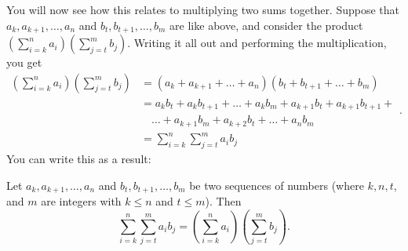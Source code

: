 \documentclass[
  12pt,
  a4paper, oneside]{starmastarticle}
\begin{document}
You will now see how this relates to multiplying two sums together.
Suppose that \(a_k,a_{k+1},\ldots,a_n\) and \(b_t,b_{t+1},\ldots,b_m\)
are like above, and consider the product
\((\sum_{i=k}^na_i)(\sum_{j=t}^mb_j)\). Writing it all out and
performing the multiplication, you get
\[\begin{equation}\begin{split} (\sum_{i=k}^na_i)(\sum_{j=t}^mb_j) &= (a_k+a_{k+1}+\ldots+a_n)(b_t + b_{t+1}+\ldots+b_m) \\ &= a_kb_t + a_kb_{t+1} + \ldots + a_kb_m + a_{k+1}b_t + a_{k+1}b_{t+1} + \\ & \quad \ldots + a_{k+1}b_m + a_{k+2}b_t + \ldots + a_nb_m \\ &= \sum_{i=k}^n\sum_{j=t}^m a_i b_j\end{split}.\end{equation}\]
You can write this as a result:

\begin{tcolorbox}[enhanced jigsaw, bottomtitle=1mm, arc=.35mm, opacityback=0, title=\textcolor{quarto-callout-note-color}{\faInfo}\hspace{0.5em}{Double sums and products of two sums}, toprule=.15mm, colback=white, left=2mm, breakable, coltitle=black, toptitle=1mm, colbacktitle=quarto-callout-note-color!10!white, colframe=quarto-callout-note-color-frame, opacitybacktitle=0.6, rightrule=.15mm, bottomrule=.15mm, titlerule=0mm, leftrule=.75mm]
Let \(a_{k},a_{k+1},\ldots,a_n\) and \(b_t,b_{t+1},\ldots,b_m\) be two
sequences of numbers (where \(k,n,t\), and \(m\) are integers with
\(k \leq n\) and \(t \leq m\)). Then
\[\sum_{i=k}^n\sum_{j=t}^m a_i b_j = (\sum_{i=k}^na_i)(\sum_{j=t}^mb_j).\]
\end{tcolorbox}

\begin{tcolorbox}[enhanced jigsaw, left=2mm, breakable, arc=.35mm, bottomrule=.15mm, opacityback=0, colframe=quarto-callout-note-color-frame, rightrule=.15mm, leftrule=.75mm, toprule=.15mm, colback=white]
\begin{minipage}[t]{5.5mm}
\textcolor{quarto-callout-note-color}{\faInfo}
\end{minipage}%
\begin{minipage}[t]{\textwidth - 5.5mm}

\end{minipage}%
\end{tcolorbox}
\end{document}
